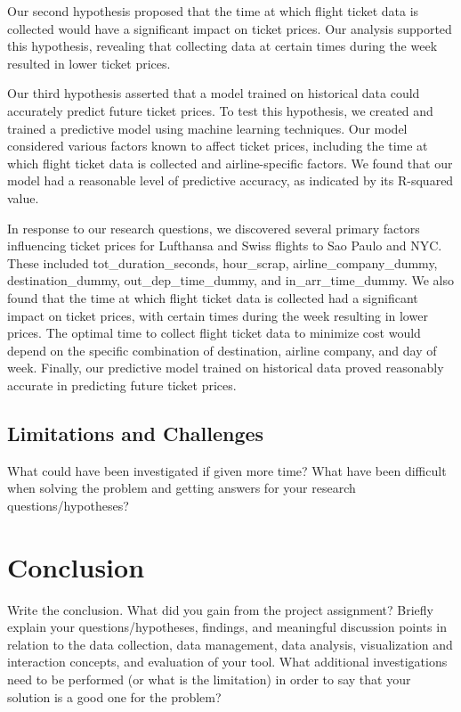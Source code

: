 Our second hypothesis proposed that the time at which flight ticket data is collected would have a significant impact on ticket prices.
Our analysis supported this hypothesis, revealing that collecting data at certain times during the week resulted in lower ticket prices.

Our third hypothesis asserted that a model trained on historical data could accurately predict future ticket prices.
To test this hypothesis, we created and trained a predictive model using machine learning techniques.
Our model considered various factors known to affect ticket prices, including the time at which flight ticket data is collected and airline-specific factors.
We found that our model had a reasonable level of predictive accuracy, as indicated by its R-squared value.

In response to our research questions, we discovered several primary factors influencing ticket prices for Lufthansa and Swiss flights to Sao Paulo and NYC.
These included tot\_duration\_seconds, hour\_scrap, airline\_company\_dummy, destination\_dummy, out\_dep\_time\_dummy, and in\_arr\_time\_dummy.
We also found that the time at which flight ticket data is collected had a significant impact on ticket prices, with certain times during the week resulting in lower prices.
The optimal time to collect flight ticket data to minimize cost would depend on the specific combination of destination, airline company, and day of week.
Finally, our predictive model trained on historical data proved reasonably accurate in predicting future ticket prices.

\subsection{Limitations and Challenges}
\label{sec:limitation}
What could have been investigated if given more time? What have been difficult when solving the problem and getting answers for your research questions/hypotheses?

\section{Conclusion}
\label{chap:conclusion}
Write the conclusion. What did you gain from the project assignment? Briefly explain your questions/hypotheses, findings, and meaningful discussion points in relation to the data collection, data management, data analysis, visualization and interaction concepts, and evaluation of your tool.
What additional investigations need to be performed (or what is the limitation) in order to say that your solution is a good one for the problem? 

